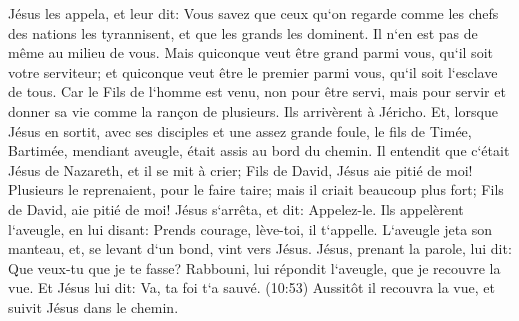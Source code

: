 \verse Jésus les appela, et leur dit: Vous savez que ceux qu`on regarde comme les chefs des nations les tyrannisent, et que les grands les dominent. 
\verse Il n`en est pas de même au milieu de vous. Mais quiconque veut être grand parmi vous, qu`il soit votre serviteur; 
\verse et quiconque veut être le premier parmi vous, qu`il soit l`esclave de tous. 
\verse Car le Fils de l`homme est venu, non pour être servi, mais pour servir et donner sa vie comme la rançon de plusieurs. 
\verse Ils arrivèrent à Jéricho. Et, lorsque Jésus en sortit, avec ses disciples et une assez grande foule, le fils de Timée, Bartimée, mendiant aveugle, était assis au bord du chemin. 
\verse Il entendit que c`était Jésus de Nazareth, et il se mit à crier; Fils de David, Jésus aie pitié de moi! 
\verse Plusieurs le reprenaient, pour le faire taire; mais il criait beaucoup plus fort; Fils de David, aie pitié de moi! 
\verse Jésus s`arrêta, et dit: Appelez-le. Ils appelèrent l`aveugle, en lui disant: Prends courage, lève-toi, il t`appelle. 
\verse L`aveugle jeta son manteau, et, se levant d`un bond, vint vers Jésus. 
\verse Jésus, prenant la parole, lui dit: Que veux-tu que je te fasse? Rabbouni, lui répondit l`aveugle, que je recouvre la vue. 
\verse Et Jésus lui dit: Va, ta foi t`a sauvé. (10:53) Aussitôt il recouvra la vue, et suivit Jésus dans le chemin. 

\chapter{}

